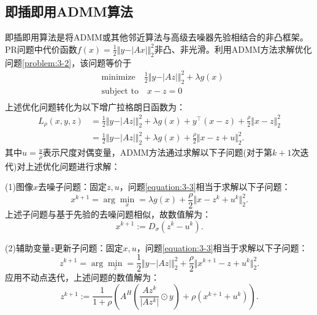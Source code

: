 \subsection{即插即用ADMM算法}
即插即用算法是将ADMM或其他邻近算法与高级去噪器先验相结合的非凸框架。PR问题中代价函数$f(x)=\frac{1}{2}{\Vert{y-\vert{Ax}\vert}\Vert_2^2}$非凸、非光滑。利用ADMM方法求解优化问题\eqref{problem:3-2}，该问题等价于
\begin{equation} \label{problem:3-3}
	\begin{aligned} 
		&\text{minimize}\quad\frac{1}{2}{\Vert{y-\vert{Az}\vert}\Vert_2^2}+\lambda{g(x)} \\
		&\text{subject\ to}\quad x-z=0 \\
	\end{aligned}
\end{equation}
上述优化问题转化为以下增广拉格朗日函数为：
\begin{equation} \label{equation:3-3}
	\begin{aligned}
		L_{\rho}(x,y,z)&=\frac{1}{2}{\Vert{y-\vert{Az}\vert}\Vert_2^2}+\lambda{g(x)}+y^\top(x-z)+\frac{\rho}{2}\Vert{x-z}\Vert_2^2\\
		&=\frac{1}{2}{\Vert{y-\vert{Az}\vert}\Vert_2^2}+\lambda{g(x)}+\frac{\rho}{2}\Vert{x-z+u}\Vert_2^2.
	\end{aligned}
\end{equation}
其中$u=\frac{y}{\rho}$表示尺度对偶变量，ADMM方法通过求解以下子问题(对于第$k+1$次迭代)对上述优化问题进行求解：

(1)图像$x$去噪子问题：固定$z,u$，问题\eqref{equation:3-3}相当于求解以下子问题：
\begin{equation} \label{}
	x^{k+1}=\arg\min_{x}=\lambda{g(x)}+\frac{\rho}{2}\Vert{x-z^k+u^k}\Vert_2^2.
\end{equation}
上述子问题与基于先验的去噪问题相似，故数值解为：
\begin{equation} \label{third:x-step}
	x^{k+1}:=D_{\sigma}(z^k-u^k).
\end{equation}

(2)辅助变量$z$更新子问题：固定$x,u$，问题\eqref{equation:3-3}相当于求解以下子问题：
\begin{equation} \label{equation:3-4}
	z^{k+1}=\arg\min_{z}=\frac{1}{2}{\Vert{y-\vert{Az}\vert}\Vert_2^2}+\frac{\rho}{2}\Vert{x^{k+1}-z+u^k}\Vert_2^2.
\end{equation}
应用不动点迭代，上述问题的数值解为：
\begin{equation} \label{equation:3-5}
	z^{k+1}:=\frac{1}{1+\rho}\left({A^{\mathit{H}}\left(\frac{Az^k}{\vert{Az^k}\vert}\odot{y}\right)}+\rho{(x^{k+1}+u^k)}\right).
\end{equation}

